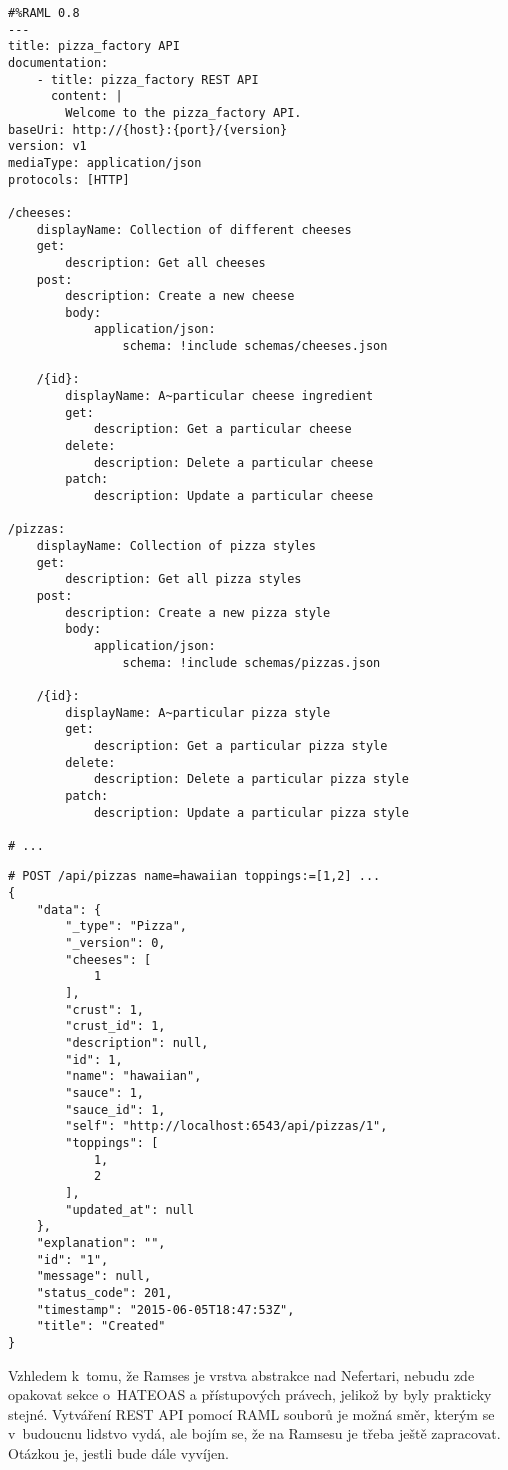 \begin{listing}[htbp]
\caption{{\label{code:ramses}Příklad použití Ramsesu \autocite{ramsespizza}}}
\begin{verbatim}
#%RAML 0.8
---
title: pizza_factory API
documentation:
    - title: pizza_factory REST API
      content: |
        Welcome to the pizza_factory API.
baseUri: http://{host}:{port}/{version}
version: v1
mediaType: application/json
protocols: [HTTP]

/cheeses:
    displayName: Collection of different cheeses
    get:
        description: Get all cheeses
    post:
        description: Create a new cheese
        body:
            application/json:
                schema: !include schemas/cheeses.json

    /{id}:
        displayName: A~particular cheese ingredient
        get:
            description: Get a particular cheese
        delete:
            description: Delete a particular cheese
        patch:
            description: Update a particular cheese

/pizzas:
    displayName: Collection of pizza styles
    get:
        description: Get all pizza styles
    post:
        description: Create a new pizza style
        body:
            application/json:
                schema: !include schemas/pizzas.json

    /{id}:
        displayName: A~particular pizza style
        get:
            description: Get a particular pizza style
        delete:
            description: Delete a particular pizza style
        patch:
            description: Update a particular pizza style

# ...
\end{verbatim}
\end{listing}

\begin{listing}[htbp]
\caption{{\label{code:ramsesreply}Odpověď Ramsesu \autocite{ramsespizza}}}
\begin{verbatim}
# POST /api/pizzas name=hawaiian toppings:=[1,2] ...
{
    "data": {
        "_type": "Pizza",
        "_version": 0,
        "cheeses": [
            1
        ],
        "crust": 1,
        "crust_id": 1,
        "description": null,
        "id": 1,
        "name": "hawaiian",
        "sauce": 1,
        "sauce_id": 1,
        "self": "http://localhost:6543/api/pizzas/1",
        "toppings": [
            1,
            2
        ],
        "updated_at": null
    },
    "explanation": "",
    "id": "1",
    "message": null,
    "status_code": 201,
    "timestamp": "2015-06-05T18:47:53Z",
    "title": "Created"
}
\end{verbatim}
\end{listing}

Vzhledem k~tomu, že Ramses je vrstva abstrakce nad Nefertari, nebudu zde opakovat sekce o~HATEOAS a přístupových právech, jelikož by byly prakticky stejné. Vytváření REST API pomocí RAML souborů je možná směr, kterým se v~budoucnu lidstvo vydá, ale bojím se, že na Ramsesu je třeba ještě zapracovat. Otázkou je, jestli bude dále vyvíjen.
